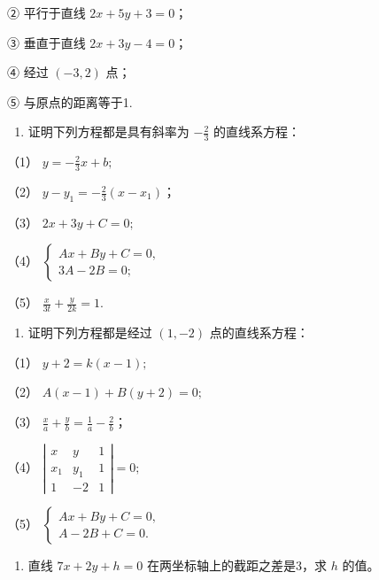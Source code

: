 ② 平行于直线 \(2x + 5y + 3 = 0\)；

③ 垂直于直线 \(2x + 3y - 4 = 0\)；

④ 经过 \((-3,2)\) 点；

⑤ 与原点的距离等于1.

\begin{enumerate}
\def\labelenumi{\arabic{enumi}.}
\tightlist
\item
  证明下列方程都是具有斜率为 \(-\frac{2}{3}\) 的直线系方程：
\end{enumerate}

（1） \(y = -\frac{2}{3} x + b;\)

（2） \(y - y_{1} = -\frac{2}{3}(x - x_{1})\)；

（3） \(2x + 3y + C = 0;\)

（4）
\(\left\{ \begin{array}{l} Ax + By + C = 0, \\ 3A - 2B = 0; \end{array} \right.\)

（5） \(\frac{x}{3t} + \frac{y}{2k} = 1.\)

\begin{enumerate}
\def\labelenumi{\arabic{enumi}.}
\setcounter{enumi}{1}
\tightlist
\item
  证明下列方程都是经过 \((1, -2)\) 点的直线系方程：
\end{enumerate}

（1） \(y + 2 = k(x - 1);\)

（2） \(A(x - 1) + B(y + 2) = 0;\)

（3） \(\frac{x}{a} + \frac{y}{b} = \frac{1}{a} - \frac{2}{b}\)；

（4）
\(\left| \begin{array}{ccc} x & y & 1 \\ x_1 & y_1 & 1 \\ 1 & -2 & 1 \end{array} \right| = 0;\)

（5）
\(\left\{ \begin{array}{l} Ax + By + C = 0, \\ A - 2B + C = 0. \end{array} \right.\)

\begin{enumerate}
\def\labelenumi{\arabic{enumi}.}
\setcounter{enumi}{2}
\tightlist
\item
  直线 \(7x + 2y + h = 0\) 在两坐标轴上的截距之差是3，求 \(h\) 的值。
\end{enumerate}

